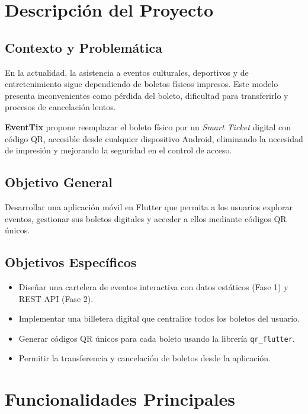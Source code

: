 \documentclass[12pt, letterpaper]{article}
\begin{document}
\section{Descripción del Proyecto}

\subsection{Contexto y Problemática}

En la actualidad, la asistencia a eventos culturales, deportivos y de
entretenimiento sigue dependiendo de boletos físicos impresos. Este
modelo presenta inconvenientes como pérdida del boleto, dificultad
para transferirlo y procesos de cancelación lentos.

\textbf{EventTix} propone reemplazar el boleto físico por un
\textit{Smart Ticket} digital con código QR, accesible desde cualquier
dispositivo Android, eliminando la necesidad de impresión y mejorando
la seguridad en el control de acceso.

\subsection{Objetivo General}

Desarrollar una aplicación móvil en Flutter que permita a los usuarios
explorar eventos, gestionar sus boletos digitales y acceder a ellos
mediante códigos QR únicos.

\subsection{Objetivos Específicos}

\begin{itemize}[noitemsep]
    \item Diseñar una cartelera de eventos interactiva con datos estáticos (Fase 1) y REST API (Fase 2).
    \item Implementar una billetera digital que centralice todos los boletos del usuario.
    \item Generar códigos QR únicos para cada boleto usando la librería \texttt{qr\_flutter}.
    \item Permitir la transferencia y cancelación de boletos desde la aplicación.
\end{itemize}

\section{Funcionalidades Principales}
\end{document}
